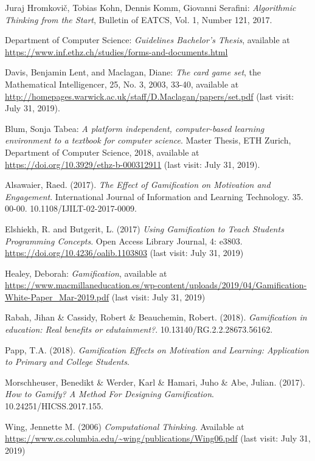 \documentclass[a4paper,oneside,11pt,final]{scrartcl}
\begin{document}
\begin{thebibliography}{9} 

 Juraj Hromkovi{\v{c}}, Tobias Kohn, Dennis Komm, Giovanni
Serafini: \textit{Algorithmic Thinking from the Start}, Bulletin of EATCS, Vol.
1, Number 121, 2017. 

 Department of Computer Science: \textit{Guidelines Bachelor's Thesis}, available at \url{https://www.inf.ethz.ch/studies/forms-and-documents.html}

 Davis, Benjamin Lent, and Maclagan, Diane: \textit{The card game
set}, the Mathematical Intelligencer, 25, No. 3, 2003, 33-40, available at
\url{http://homepages.warwick.ac.uk/staff/D.Maclagan/papers/set.pdf} (last
visit: July 31, 2019).

 Blum, Sonja Tabea: \textit{A platform independent,
computer-based learning environment to a textbook for computer science}. Master
Thesis, ETH Zurich, Department of Computer Science, 2018, available at
\url{https://doi.org/10.3929/ethz-b-000312911} (last visit: July 31, 2019).

 Alsawaier, Raed. (2017). \textit{The Effect of Gamification on
Motivation and Engagement}. International Journal of Information and Learning
Technology. 35. 00-00. 10.1108/IJILT-02-2017-0009. 

 Elshiekh, R. and Butgerit, L. (2017) \textit{Using Gamification
to Teach Students Programming Concepts}. Open Access Library Journal, 4: e3803.
\url{https://doi.org/10.4236/oalib.1103803} (last visit: July 31, 2019)

 Healey, Deborah: \textit{Gamification}, available at
\url{https://www.macmillaneducation.es/wp-content/uploads/2019/04/Gamification-White-Paper_Mar-2019.pdf}
(last visit: July 31, 2019)

 Rabah, Jihan \& Cassidy, Robert \& Beauchemin, Robert. (2018).
\textit{Gamification in education: Real benefits or edutainment?}.
10.13140/RG.2.2.28673.56162.

 Papp, T.A. (2018). \textit{Gamification Effects on Motivation and
Learning: Application to Primary and College Students}.

 Morschheuser, Benedikt \& Werder, Karl \& Hamari, Juho \& Abe,
Julian. (2017). \textit{How to Gamify? A Method For Designing Gamification}.
10.24251/HICSS.2017.155. 

 Wing, Jennette M. (2006) \textit{Computational Thinking}. Available
at \url{https://www.cs.columbia.edu/~wing/publications/Wing06.pdf} (last visit:
July 31, 2019)


\end{thebibliography}
\end{document}
